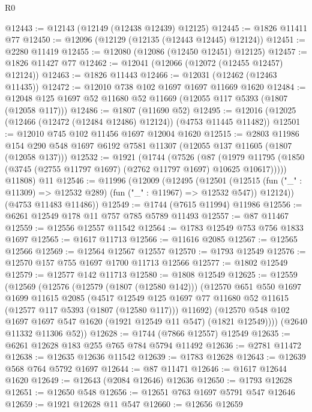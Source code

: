 \begin{lexlean}{R0}
\begin{coremodule}
@12443 := @12143 (@12149 (@12438 @12439) @12125)
@12445 := @1826 @11411 @77
@12450 := @12096 (@12129 (@12135 (@12443 @12445) @12124))
@12451 := @2280 @11419
@12455 := @12080 (@12086 (@12450 @12451) @12125)
@12457 := @1826 @11427 @77
@12462 := @12041 (@12066 (@12072 (@12455 @12457) @12124))
@12463 := @1826 @11443
@12466 := @12031 (@12462 (@12463 @11435))
@12472 := @12010 @738 @102 @1697 @1697 @11669 @1620
@12484 := @12048 @125 @1697 @52 @11680 @52 @11669 (@12055 @117 @5393 (@1807 (@12058 @117)))
@12486 := @1807 (@11690 @52)
@12495 := @12016 (@12025 (@12466 (@12472 (@12484 @12486) @12124)) (@4753 @11445 @11482))
@12501 := @12010 @745 @102 @11456 @1697 @12004 @1620
@12515 := @2803
    @11986
    @154
    @290
    @548
    @1697
    @6192
    @7581
    @11307
    (@12055 @137 @11605 (@1807 (@12058 @137)))
@12532 := @1921
    (@1744
      (@7526
        (@87
          (@1979 @11795 (@1850 (@3745 (@2755 @11797 @1697) (@2762 @11797 @1697) @10625 @10617)))))
      @11808)
    @11
@12546 := @11996
    (@12009
      (@12495
        (@12501
          (@12515 (fun ("_" : @11309) => @12532 @289) (fun ("_" : @11967) => @12532 @547))
          @12124))
      (@4753 @11483 @11486))
@12549 := @1744 (@7615 @11994) @11986
@12556 := @6261 @12549 @178 @11 @757 @785 @5789 @11493
@12557 := @87 @11467
@12559 := @12556 @12557 @11542
@12564 := @1783 @12549 @753 @756 @1833 @1697
@12565 := @1617 @11713
@12566 := @11616 @2085
@12567 := @12565 @12566
@12569 := @12564 @12567 @12557
@12570 := @1793 @12549
@12576 := @12570 @157 @755 @1697 @1700 @11713 @12566
@12577 := @1802 @12549
@12579 := @12577 @142 @11713
@12580 := @1808 @12549
@12625 := @12559
    (@12569
      (@12576
        (@12579 (@1807 (@12580 @142)))
        (@12570
          @651
          @550
          @1697
          @1699
          @11615
          @2085
          (@4517
            @12549
            @125
            @1697
            @77
            @11680
            @52
            @11615
            (@12577 @117 @5393 (@1807 (@12580 @117)))
            @11692)
          (@12570 @548 @102 @1697 @1697 @547 @1620 (@1921 @12549 @11 @547) (@1821 @12549))))
      (@2640 @11332 @11306 @52))
@12628 := @1744 (@7866 @12557) @12549
@12635 := @6261 @12628 @183 @255 @765 @784 @5794 @11492
@12636 := @2781 @11472
@12638 := @12635 @12636 @11542
@12639 := @1783 @12628
@12643 := @12639 @568 @764 @5792 @1697
@12644 := @87 @11471
@12646 := @1617 @12644 @1620
@12649 := @12643 (@2084 @12646) @12636
@12650 := @1793 @12628
@12651 := @12650 @548
@12656 := @12651 @763 @1697 @5791 @547 @12646
@12659 := @1921 @12628 @11 @547
@12660 := @12656 @12659

\end{coremodule}
\end{lexlean}

